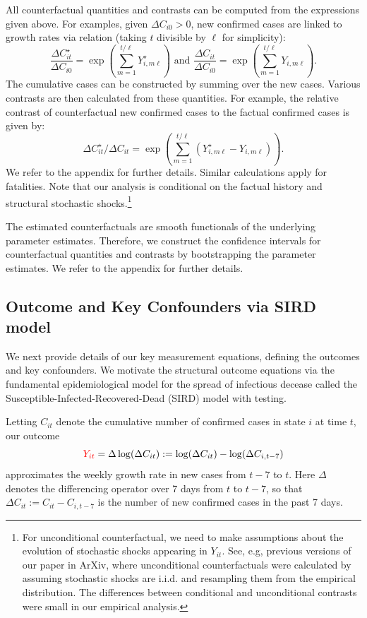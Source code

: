 \documentclass[11pt,reqno,letter]{amsart}
\theoremstyle{definition}
\def\ycolor{\color{red}}
\begin{document}
All counterfactual quantities and contrasts can be computed from the expressions given
above. For examples, given $\Delta C_{i0}>0$, new confirmed cases are linked to growth rates via relation
(taking $t$ divisible by $\ell$ for simplicity):
$$
\frac{\Delta C^{\star}_{it}}{\Delta C_{i0}} = \exp\left (  \sum_{m=1}^{t/\ell}  Y^\star_{i,m\ell} \right) \text{ and }\frac{ \Delta C_{it}}{\Delta C_{i0}} = \exp
\left (  \sum_{m=1}^{t/\ell}   Y_{i, m \ell }\right).
$$
The cumulative cases can be constructed by summing over the new cases. Various contrasts are
then calculated from these quantities. For example, the relative contrast of counterfactual new confirmed cases
to the  factual confirmed cases is given by:
$$
\Delta C^{\star}_{it}/\Delta C_{it} = \exp\left(  \sum_{m=1}^{t/\ell} ( Y^\star_{i,m\ell} -  Y_{i,m \ell}) \right).
$$
We refer to the appendix for further details. Similar calculations apply for fatalities. 
Note that our analysis is conditional on the factual history and structural stochastic 
shocks.\footnote{For unconditional counterfactual,
we need to make assumptions about the evolution of stochastic shocks appearing in $Y_{it}$. See, e.g, previous
versions of our paper in ArXiv, where unconditional counterfactuals were calculated by assuming stochastic shocks
are i.i.d. and resampling them from the empirical distribution. The differences between conditional and unconditional
contrasts were small in our empirical analysis.}

The estimated counterfactuals are smooth functionals of the underlying parameter estimates. Therefore, we
construct the confidence intervals for counterfactual quantities and contrasts by bootstrapping the parameter
estimates. We refer to the appendix for further details.


\subsection{Outcome and Key Confounders via SIRD model}\label{sec:sirmodel} We next provide details
of our key measurement equations, defining the outcomes and key confounders. We motivate the structural
outcome equations via the fundamental epidemiological model for the spread of infectious decease called
the Susceptible-Infected-Recovered-Dead (SIRD) model with testing.

Letting $C_{it}$ denote the cumulative number of  confirmed cases in state $i$ at time $t$, our outcome
\begin{equation} \label{eq:y}
{\ycolor Y_{it}} =\Delta \log(\Delta C_{it}):= \log( \Delta C_{it} ) -
\log( \Delta C_{i,t-7})
\end{equation}
approximates the weekly growth rate in new cases from $t-7$ to $t$. Here $\Delta$ denotes the differencing operator over 7 days from $t$ to $t-7$, so that $\Delta C_{it}:=C_{it}-C_{i,t-7}$ is the number of new confirmed cases in the past 7 days.
\end{document}
